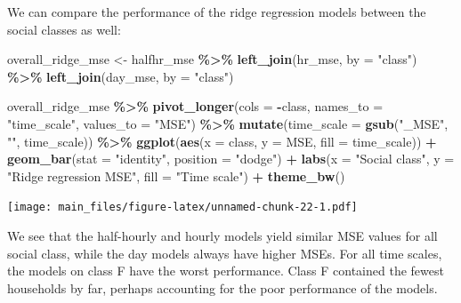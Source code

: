 \documentclass[
]{article}
\newenvironment{Shaded}{\begin{snugshade}}{\end{snugshade}}
\newcommand{\AttributeTok}[1]{\textcolor[rgb]{0.13,0.29,0.53}{#1}}
\newcommand{\FunctionTok}[1]{\textcolor[rgb]{0.13,0.29,0.53}{\textbf{#1}}}
\newcommand{\NormalTok}[1]{#1}
\newcommand{\OtherTok}[1]{\textcolor[rgb]{0.56,0.35,0.01}{#1}}
\newcommand{\SpecialCharTok}[1]{\textcolor[rgb]{0.81,0.36,0.00}{\textbf{#1}}}
\newcommand{\StringTok}[1]{\textcolor[rgb]{0.31,0.60,0.02}{#1}}
\begin{document}
We can compare the performance of the ridge regression models between
the social classes as well:

\begin{Shaded}
\begin{Highlighting}[]
\NormalTok{overall\_ridge\_mse }\OtherTok{\textless{}{-}}\NormalTok{ halfhr\_mse }\SpecialCharTok{\%\textgreater{}\%} 
  \FunctionTok{left\_join}\NormalTok{(hr\_mse, }\AttributeTok{by =} \StringTok{"class"}\NormalTok{) }\SpecialCharTok{\%\textgreater{}\%} 
  \FunctionTok{left\_join}\NormalTok{(day\_mse, }\AttributeTok{by =} \StringTok{"class"}\NormalTok{)}

\NormalTok{overall\_ridge\_mse }\SpecialCharTok{\%\textgreater{}\%} 
  \FunctionTok{pivot\_longer}\NormalTok{(}\AttributeTok{cols =} \SpecialCharTok{{-}}\NormalTok{class, }\AttributeTok{names\_to =} \StringTok{"time\_scale"}\NormalTok{, }\AttributeTok{values\_to =} \StringTok{"MSE"}\NormalTok{) }\SpecialCharTok{\%\textgreater{}\%}
  \FunctionTok{mutate}\NormalTok{(}\AttributeTok{time\_scale =} \FunctionTok{gsub}\NormalTok{(}\StringTok{"\_MSE"}\NormalTok{, }\StringTok{""}\NormalTok{, time\_scale)) }\SpecialCharTok{\%\textgreater{}\%} 
  \FunctionTok{ggplot}\NormalTok{(}\FunctionTok{aes}\NormalTok{(}\AttributeTok{x =}\NormalTok{ class, }\AttributeTok{y =}\NormalTok{ MSE, }\AttributeTok{fill =}\NormalTok{ time\_scale)) }\SpecialCharTok{+}
  \FunctionTok{geom\_bar}\NormalTok{(}\AttributeTok{stat =} \StringTok{"identity"}\NormalTok{, }\AttributeTok{position =} \StringTok{"dodge"}\NormalTok{) }\SpecialCharTok{+}
  \FunctionTok{labs}\NormalTok{(}\AttributeTok{x =} \StringTok{"Social class"}\NormalTok{, }\AttributeTok{y =} \StringTok{"Ridge regression MSE"}\NormalTok{, }\AttributeTok{fill =} \StringTok{"Time scale"}\NormalTok{) }\SpecialCharTok{+}
  \FunctionTok{theme\_bw}\NormalTok{()}
\end{Highlighting}
\end{Shaded}

\texttt{[image: main\_files/figure-latex/unnamed-chunk-22-1.pdf]}

We see that the half-hourly and hourly models yield similar MSE values
for all social class, while the day models always have higher MSEs. For
all time scales, the models on class F have the worst performance. Class
F contained the fewest households by far, perhaps accounting for the
poor performance of the models.
\end{document}
